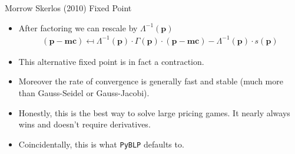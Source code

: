 \begin{frame}{Morrow Skerlos (2010) Fixed Point}
\begin{itemize}
\item After factoring we can rescale by $\Lambda^{-1} (\mathbf{p})$
\begin{align*}
(\mathbf{p}-\mathbf{mc} ) \mapsfrom \Lambda^{-1}(\mathbf{p}) \cdot \Gamma(\mathbf{p})\cdot(\mathbf{p}- \mathbf{mc}) - \Lambda^{-1}(\mathbf{p})\cdot s(\mathbf{p})
\end{align*}
\item This alternative fixed point is in fact a contraction.
\item Moreover the rate of convergence is generally fast and stable (much more than Gauss-Seidel or Gauss-Jacobi).
\item Honestly, this is the best way to solve large pricing games. It nearly always wins and doesn't require derivatives.
\item Coincidentally, this is what \texttt{PyBLP} defaults to.
\end{itemize}
\end{frame}





